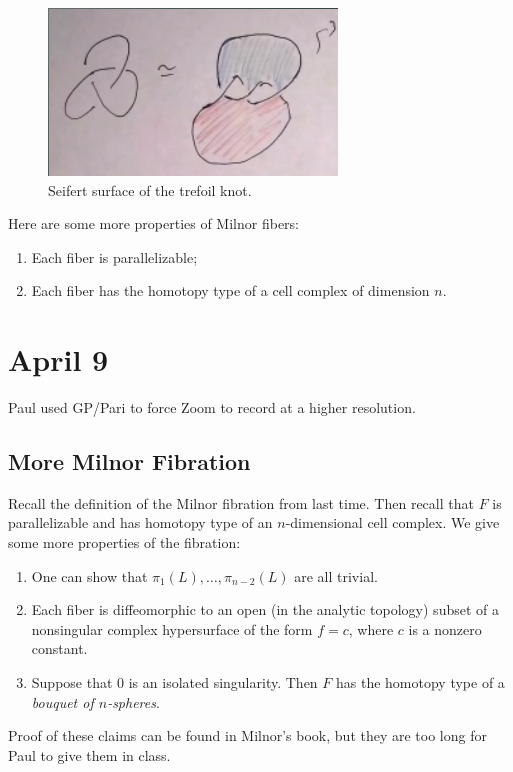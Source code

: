 \documentclass[leqno, openany]{memoir}
\theoremstyle{definition}
\theoremstyle{remark}
\theoremstyle{plain}
\theoremstyle{definition}
\theoremstyle{remark}
\begin{document}
\begin{figure}[H] \centering \includegraphics[width=0.8\linewidth]{seifert}
    \caption{Seifert surface of the trefoil knot.}%
\end{figure}

Here are some more properties of Milnor fibers: \begin{enumerate} \item Each
fiber is parallelizable; \item Each fiber has the homotopy type of a cell
complex of dimension $n$.  \end{enumerate}

\chapter{April 9}%

Paul used GP/Pari to force Zoom to record at a higher resolution.

\section{More Milnor Fibration}%

Recall the definition of the Milnor fibration from last time. Then recall that
$F$ is parallelizable and has homotopy type of an $n$-dimensional cell complex.
We give some more properties of the fibration: \begin{enumerate} \item One can
    show that $\pi_1(L), \ldots, \pi_{n-2}(L)$ are all trivial.  \item Each
    fiber is diffeomorphic to an open (in the analytic topology) subset of a
    nonsingular complex hypersurface of the form $f = c$, where $c$ is a
    nonzero constant.  \item Suppose that $0$ is an isolated singularity. Then
    $F$ has the homotopy type of a \textit{bouquet of $n$-spheres}.
    \end{enumerate} Proof of these claims can be found in Milnor's book, but
    they are too long for Paul to give them in class.
\end{document}

